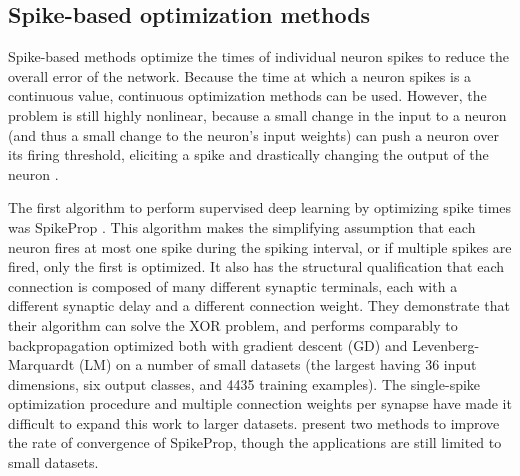

\subsection{Spike-based optimization methods}

Spike-based methods optimize the times of individual neuron spikes
to reduce the overall error of the network.
Because the time at which a neuron spikes is a continuous value,
continuous optimization methods can be used.
However, the problem is still highly nonlinear,
because a small change in the input to a neuron
(and thus a small change to the neuron's input weights)
can push a neuron over its firing threshold,
eliciting a spike and drastically changing the output of the neuron \parencite{Gutig2014}.



The first algorithm to perform supervised deep learning
by optimizing spike times was SpikeProp \parencite{Bohte2002}.
This algorithm makes the simplifying assumption that
each neuron fires at most one spike during the spiking interval,
or if multiple spikes are fired,
only the first is optimized.
It also has the structural qualification that each connection
is composed of many different synaptic terminals,
each with a different synaptic delay and a different connection weight.
They demonstrate that their algorithm can solve the XOR problem,
and performs comparably to backpropagation optimized both
with gradient descent (GD) and Levenberg-Marquardt (LM)
on a number of small datasets
(the largest having 36 input dimensions, six output classes, and 4435 training examples).
The single-spike optimization procedure and multiple connection weights per synapse
have made it difficult to expand this work to larger datasets.
\textcite{McKennoch2006} present two methods to improve
the rate of convergence of SpikeProp,
though the applications are still limited to small datasets.

